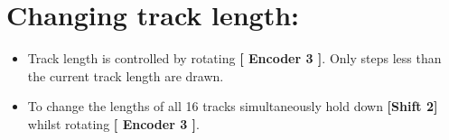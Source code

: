 \section{Changing track length:}
\begin{itemize}
	\item Track length is controlled by rotating \textbf{[ Encoder 3 ]}. Only steps less than the current track length are drawn.
	\item To change the lengths of all 16 tracks simultaneously hold down \textbf{[Shift 2]} whilst rotating \textbf{[ Encoder 3 ]}.
\end{itemize}

